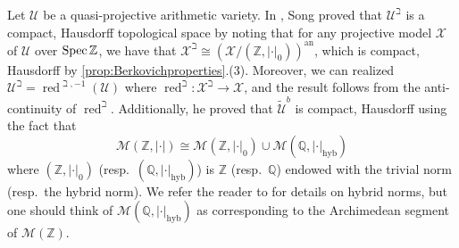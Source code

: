 \documentclass[11pt,reqno]{amsart}
\newcommand{\mZ}{\mathbb{Z}}
\newcommand{\mQ}{\mathbb{Q}}
\newcommand{\cX}{\mathcal{X}}
\newcommand{\cU}{\mathcal{U}}
\newcommand{\wt}[1]{\widetilde{#1}}
\newcommand{\sH}{{\mathscr H}}
\newcommand{\sM}{{\mathscr M}}
\theoremstyle{theorem}
\numberwithin{equation}{subsection}
\numberwithin{equation}{subsection}
\theoremstyle{definition}
\newtheorem{example}[subsubsection]{Example}
\theoremstyle{remark}
\numberwithin{equation}{subsubsection} \numberwithin{figure}{section}
\DeclareMathOperator{\an}{an}
\DeclareMathOperator{\red}{red}
\renewcommand{\leq}{\leqslant}
\DeclareMathOperator{\Ban}{Ban}
\begin{document}
%

Let $\cU$ be a quasi-projective arithmetic variety. In \cite{Song:EquivariantAdelic}, Song proved that $\cU^{\beth}$ is a compact, Hausdorff topological space by noting that for any projective model $\cX$ of $\cU$ over $\Spec \mZ$, we have that $\cX^{\beth} \cong (\cX/(\mZ,|\cdot|_0))^{\an}$, which is compact, Hausdorff by \autoref{prop:Berkovichproperties}.(3). Moreover, we can realized $\cU^{\beth} = \red^{\beth, -1}(\cU)$ where $\red^{\beth}\colon \cX^{\beth} \to \cX$, and the result follows from the anti-continuity of $\red^{\beth}$. 
Additionally, he proved that $\wt{\cU}^b$ is compact, Hausdorff using the fact that
\[
\sM(\mZ,|\cdot|) \cong \sM(\mZ,|\cdot|_{0}) \cup \sM(\mQ,|\cdot|_{\text{hyb}})
\]
where $(\mZ,|\cdot|_0)$ (resp.~$(\mQ,|\cdot|_{\text{hyb}})$) is $\mZ$ (resp.~$\mQ$) endowed with the trivial norm (resp.~the hybrid norm). 
We refer the reader to \cite[Section 2.2]{Song:EquivariantAdelic} for details on hybrid norms, but one should think of $\sM(\mQ,|\cdot|_{\text{hyb}})$ as corresponding to the Archimedean segment of $\sM(\mZ)$. 
\end{document}
